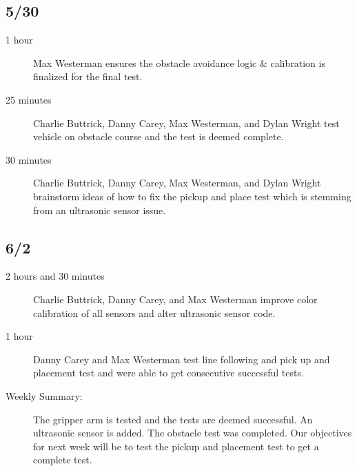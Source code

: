 \documentclass[11pt]{report}
\begin{document}
\begin{adjustwidth}{0.5cm}{0cm}
\subsection*{5/30}
\begin{greylineformat}
\begin{description}
    \item [1 hour] Max Westerman ensures the obstacle avoidance logic \& calibration is finalized for the final test.
    \item [25 minutes] Charlie Buttrick, Danny Carey, Max Westerman, and Dylan Wright test vehicle on obstacle course and the test is deemed complete.
    \item [30 minutes] Charlie Buttrick, Danny Carey, Max Westerman, and Dylan Wright brainstorm ideas of how to fix the pickup and place test which is stemming from an ultrasonic sensor issue. 
\end{description}\end{greylineformat}

\vspace{-2.1em}\subsection*{6/2}
\begin{greylineformat}
\begin{description}
    \item [2 hours and 30 minutes] Charlie Buttrick, Danny Carey, and Max Westerman improve color calibration of all sensors and alter ultrasonic sensor code. 
    \item [1 hour] Danny Carey and Max Westerman test line following and pick up and placement test and were able to get consecutive successful tests. 
\end{description}\end{greylineformat}

\begin{description}
    \item [Weekly Summary:]The gripper arm is tested and the tests are deemed successful. An ultrasonic sensor is added. The obstacle test was completed. Our objectives for next week will be to test the pickup and placement test to get a complete test.
\end{description}\vspace{0.5em}
\end{adjustwidth}
\end{document}
